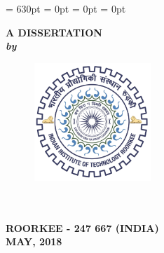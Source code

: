 \begin{titlepage}
\renewcommand{\baselinestretch}{1.5}
  \setlength{\parindent}{0pt}
\textheight = 630pt \topmargin=0pt \voffset=1cm \headheight = 0pt
\marginparwidth= 0pt \headsep = 0pt
\pagestyle{empty}

\begin{center}
\renewcommand{\baselinestretch}{1.2}
\thispagestyle{empty}
\vspace{-10pt}

{\Large \bfseries {\ttitle}\par}\vspace{0.4cm} %

\begingroup
    \fontsize{12pt}{12pt} \selectfont
    \bfseries
\vspace{2.5cm}
{\large\textbf{A DISSERTATION}} \\\vspace{1.5cm}
{\normalsize\textbf{\textit{by}}}\\\vspace{1.5cm}
{\normalsize\textbf{\authorname}}
\endgroup

\vspace{3.5cm}
\begin{figure}[h]
  \centering
  \includegraphics[width=1.75in, height=1.75in]{formalities/logo.jpg}
\end{figure}
\renewcommand{\baselinestretch}{1.2}
\vspace{2.3cm}
\begingroup
    \fontsize{14pt}{12pt} \selectfont
    \bfseries
\deptname\\
\univname\\
ROORKEE - 247 667 (INDIA)\\
MAY, 2018  
\endgroup
\end{center}

\end{titlepage}